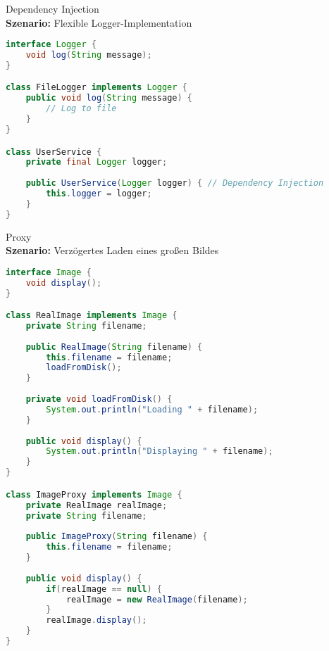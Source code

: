 \begin{example}{Dependency Injection}\\
\textbf{Szenario:} Flexible Logger-Implementation
\begin{lstlisting}[language=Java, style=base]
interface Logger {
    void log(String message);
}

class FileLogger implements Logger {
    public void log(String message) {
        // Log to file
    }
}

class UserService {
    private final Logger logger;
    
    public UserService(Logger logger) { // Dependency Injection
        this.logger = logger;
    }
}
\end{lstlisting}
\end{example}

\begin{example}{Proxy}\\
\textbf{Szenario:} Verzögertes Laden eines großen Bildes
\begin{lstlisting}[language=Java, style=base]
interface Image {
    void display();
}

class RealImage implements Image {
    private String filename;
    
    public RealImage(String filename) {
        this.filename = filename;
        loadFromDisk();
    }
    
    private void loadFromDisk() {
        System.out.println("Loading " + filename);
    }
    
    public void display() {
        System.out.println("Displaying " + filename);
    }
}

class ImageProxy implements Image {
    private RealImage realImage;
    private String filename;
    
    public ImageProxy(String filename) {
        this.filename = filename;
    }
    
    public void display() {
        if(realImage == null) {
            realImage = new RealImage(filename);
        }
        realImage.display();
    }
}
\end{lstlisting}
\end{example}

